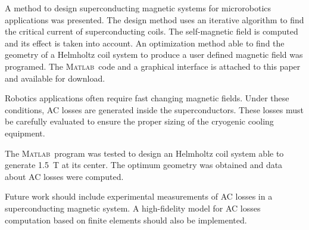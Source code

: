 \documentclass{ws-jmrr}
\newcommand{\MATLAB}{{\textsc{Matlab}}}
\begin{document}
\begin{multicols}{2}
A method to design superconducting magnetic systems for microrobotics applications was presented. 
 The design method uses an iterative algorithm to find the critical current of superconducting coils. 
  The self-magnetic field is computed and its effect is taken into account. 
  An optimization method able to find the geometry of a Helmholtz coil system to produce a user defined magnetic field was programed. 
  The \MATLAB ~code and a graphical interface is attached to this paper and available for download.\par
Robotics applications often require fast changing magnetic fields.
 Under these conditions, AC losses are generated inside the superconductors. 
 These losses must be carefully evaluated to ensure the proper sizing of the cryogenic cooling equipment.\par
The \MATLAB ~program was tested to design an Helmholtz coil system able to generate 1.5~T at its center. The optimum geometry was obtained and data about AC losses were computed.\par
Future work should include experimental measurements of AC losses in a superconducting magnetic system.
 A high-fidelity model for AC losses computation based on finite elements should also be implemented.





\end{multicols} 
\end{document}
